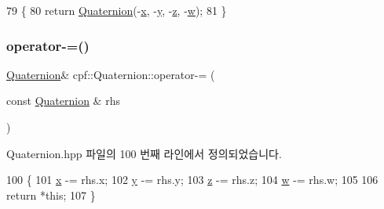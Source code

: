 \begin{DoxyCode}
79                                      \{
80             \textcolor{keywordflow}{return} \hyperlink{classcpf_1_1_quaternion_aae3cc98fcdb7a419a29db4ee988972bc}{Quaternion}(-\hyperlink{classcpf_1_1_quaternion_a200f7bce4e673281af8cc7dd75cb0677}{x}, -\hyperlink{classcpf_1_1_quaternion_a4fbade6e58be55a49c94e7f157988136}{y}, -\hyperlink{classcpf_1_1_quaternion_ade9c41b717605118e5fdf95d96a843b4}{z}, -\hyperlink{classcpf_1_1_quaternion_af312a196b39bb4903b876bc454ac15f8}{w});
81         \}
\end{DoxyCode}
\mbox{\label{classcpf_1_1_quaternion_a02f597bd2b0d9c3c7410e409f7f63090}} 
\subsubsection{\texorpdfstring{operator-\/=()}{operator-=()}}
{\footnotesize\ttfamily \hyperlink{classcpf_1_1_quaternion}{Quaternion}\& cpf\+::\+Quaternion\+::operator-\/= (\begin{DoxyParamCaption}\item[{const \hyperlink{classcpf_1_1_quaternion}{Quaternion} \&}]{rhs }\end{DoxyParamCaption})\hspace{0.3cm}{\ttfamily [inline]}}



Quaternion.\+hpp 파일의 100 번째 라인에서 정의되었습니다.


\begin{DoxyCode}
100                                                       \{
101             \hyperlink{classcpf_1_1_quaternion_a200f7bce4e673281af8cc7dd75cb0677}{x} -= rhs.x;
102             \hyperlink{classcpf_1_1_quaternion_a4fbade6e58be55a49c94e7f157988136}{y} -= rhs.y;
103             \hyperlink{classcpf_1_1_quaternion_ade9c41b717605118e5fdf95d96a843b4}{z} -= rhs.z;
104             \hyperlink{classcpf_1_1_quaternion_af312a196b39bb4903b876bc454ac15f8}{w} -= rhs.w;
105 
106             \textcolor{keywordflow}{return} *\textcolor{keyword}{this};
107         \}
\end{DoxyCode}
\mbox{\label{classcpf_1_1_quaternion_a17d09acedf7ab8fd7dd125bedf395662}} 
